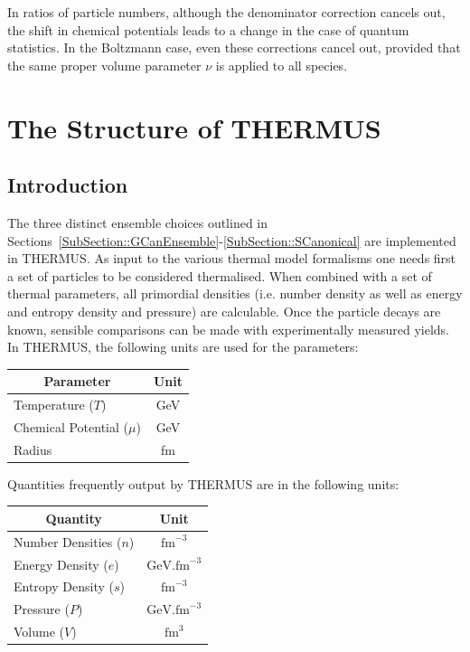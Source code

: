\documentclass{elsarticle}
\begin{document}
In ratios of particle numbers, although the denominator correction cancels 
out, the shift in chemical potentials leads to a change in the case 
of quantum statistics. In the Boltzmann case, even these corrections cancel out, 
provided that the same proper volume parameter $\nu$ is applied to all species.\\

\section{The Structure of THERMUS}

\subsection{Introduction}

The three distinct ensemble choices outlined in 
Sections~\ref{SubSection::GCanEnsemble}-\ref{SubSection::SCanonical} are 
implemented in THERMUS. As input to the various thermal model formalisms 
one needs first a set of particles to be considered 
thermalised. When combined with a set of thermal parameters, all primordial 
densities (i.e. number density as well as energy and entropy density and pressure) are 
calculable. Once the particle decays are known, sensible comparisons can be made with 
experimentally measured yields.\\

In THERMUS, the following units are used for the parameters:\\

\begin{center}
\begin{tabular}{lc}\hline
\multicolumn{1}{c}{Parameter} & Unit \\\hline\hline
Temperature ($T$)      & GeV \\
Chemical Potential ($\mu$) & GeV \\
Radius & fm  \\\hline
\end{tabular}
\end{center}

\noindent
Quantities frequently output by THERMUS are in the following units:\\ 

\begin{center}
\begin{tabular}{lc}\hline
\multicolumn{1}{c}{Quantity} & Unit \\\hline\hline
Number Densities ($n$) & $\mathrm{fm}^{-3}$ \\
Energy Density ($e$) & $\mathrm{GeV.fm}^{-3}$ \\
Entropy Density ($s$) & $\mathrm{fm}^{-3}$ \\
Pressure ($P$) & $\mathrm{GeV.fm}^{-3}$ \\
Volume ($V$) & $\mathrm{fm}^3$ \\\hline
\end{tabular}
\end{center}
\end{document}
